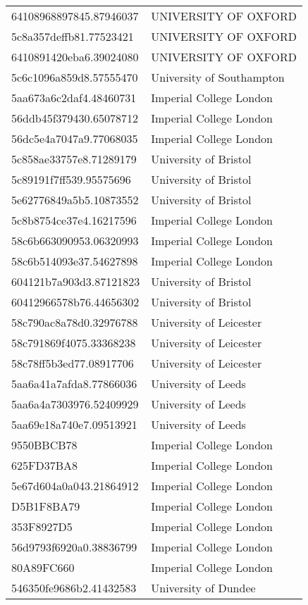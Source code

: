 \begin{tabular}{ll}
64108968897845.87946037 & UNIVERSITY OF OXFORD \\
5c8a357deffb81.77523421 & UNIVERSITY OF OXFORD \\
6410891420eba6.39024080 & UNIVERSITY OF OXFORD \\
5c6c1096a859d8.57555470 & University of Southampton \\
5aa673a6c2daf4.48460731 & Imperial College London \\
56ddb45f379430.65078712 & Imperial College London \\
56dc5e4a7047a9.77068035 & Imperial College London \\
5c858ae33757e8.71289179 & University of Bristol \\
5c89191f7ff539.95575696 & University of Bristol \\
5e62776849a5b5.10873552 & University of Bristol \\
5c8b8754ce37e4.16217596 & Imperial College London \\
58c6b663090953.06320993 & Imperial College London \\
58c6b514093e37.54627898 & Imperial College London \\
604121b7a903d3.87121823 & University of Bristol \\
60412966578b76.44656302 & University of Bristol \\
58c790ac8a78d0.32976788 & University of Leicester \\
58c791869f4075.33368238 & University of Leicester \\
58c78ff5b3ed77.08917706 & University of Leicester \\
5aa6a41a7afda8.77866036 & University of Leeds \\
5aa6a4a7303976.52409929 & University of Leeds \\
5aa69e18a740e7.09513921 & University of Leeds \\
9550BBCB78 & Imperial College London \\
625FD37BA8 & Imperial College London \\
5e67d604a0a043.21864912 & Imperial College London \\
D5B1F8BA79 & Imperial College London \\
353F8927D5 & Imperial College London \\
56d9793f6920a0.38836799 & Imperial College London \\
80A89FC660 & Imperial College London \\
546350fe9686b2.41432583 & University of Dundee \\

\end{tabular}
